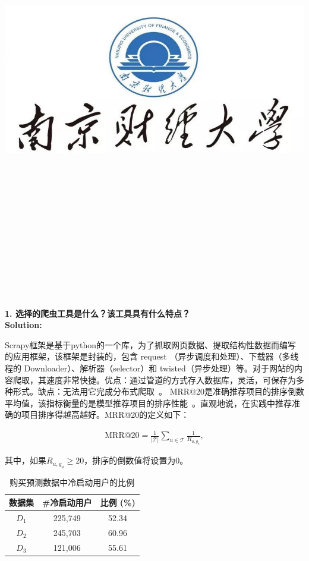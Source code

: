 \documentclass{article}
\title{
	\includegraphics[scale = 0.45]{images/title/ucas-logo1.png}\\
    \vspace{1in}
    \textmd{\textbf{\hmwkClass\ \hmwkTitle}}\\
    \textmd{\textbf{\hmwkSubTitle}}\\
    \normalsize\vspace{0.1in}\small{\hmwkCompleteTime }\\
    \vspace{0.1in}\large{\textit{\hmwkClassInstructor\ }}\\
    \vspace{3in}
}
\author{\hmwkAuthorName \\ 
	\hmwkAuthorStuID}
\date{}
\begin{document}
\maketitle


%


\pagebreak

\begin{homeworkProblem}
\textbf{1.	选择的爬虫工具是什么？该工具具有什么特点？}\\
	\textbf{Solution:}\\
	{\color{blue}Scrapy框架是基于python的一个库，为了抓取网页数据、提取结构性数据而编写的应用框架，该框架是封装的，包含 request （异步调度和处理）、下载器（多线程的 Downloader）、解析器（selector）和 twisted（异步处理）等。对于网站的内容爬取，其速度非常快捷。优点：通过管道的方式存入数据库，灵活，可保存为多种形式。缺点：无法用它完成分布式爬取~\cite{tang2015extreme}。
MRR@20是准确推荐项目的排序倒数平均值，该指标衡量的是模型推荐项目的排序性能~\cite{li2017neural}。直观地说，在实践中推荐准确的项目排序得越高越好。MRR@20的定义如下：

\begin{center}
	\begin{eqnarray}
		\text{MRR}@20=\frac{1}{|\mathcal{T}|}\sum_{u \in \mathcal{T}}\frac{1}{{R_{u,g_u}}},
		\label{eq:MRR}
	\end{eqnarray}
\end{center}
其中，如果$R_{u,g_u}\geq 20$，排序的倒数值将设置为0。	
  
\begin{table}[htbp]
	\centering
	\caption{购买预测数据中冷启动用户的比例}
	\label{coldstartuser}
	\begin{tabular}{c|cc}
		\hline
		数据集 & \#冷启动用户  & 比例 (\%)   \\
		\hline
		$D_1$   & 225,749 & 52.34     \\
		$D_2$  & 245,703 & 60.96     \\
		$D_3$   & 121,006   & 55.61    \\
		\hline
	\end{tabular}%
\end{table}

}
\end{homeworkProblem}
\end{document}
